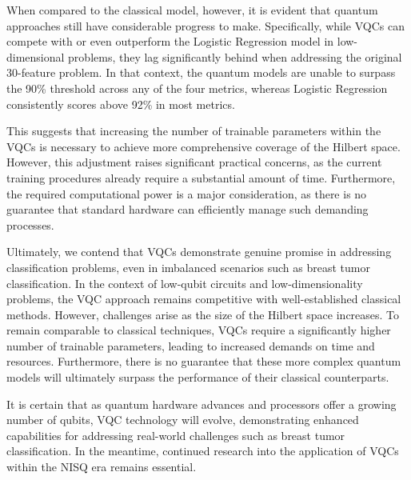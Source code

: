 \documentclass[en]{dimscthesis}
\begin{document}
When compared to the classical model, however, it is evident that quantum approaches still have considerable progress to make. Specifically, while VQCs can compete with or even outperform the Logistic Regression model in low-dimensional problems, they lag significantly behind when addressing the original 30-feature problem. In that context, the quantum models are unable to surpass the 90\% threshold across any of the four metrics, whereas Logistic Regression consistently scores above 92\% in most metrics. 

This suggests that increasing the number of trainable parameters within the VQCs is necessary to achieve more comprehensive coverage of the Hilbert space. However, this adjustment raises significant practical concerns, as the current training procedures already require a substantial amount of time. Furthermore, the required computational power is a major consideration, as there is no guarantee that standard hardware can efficiently manage such demanding processes.

Ultimately, we contend that VQCs demonstrate genuine promise in addressing classification problems, even in imbalanced scenarios such as breast tumor classification. In the context of low-qubit circuits and low-dimensionality problems, the VQC approach remains competitive with well-established classical methods. However, challenges arise as the size of the Hilbert space increases. To remain comparable to classical techniques, VQCs require a significantly higher number of trainable parameters, leading to increased demands on time and resources. Furthermore, there is no guarantee that these more complex quantum models will ultimately surpass the performance of their classical counterparts.

It is certain that as quantum hardware advances and processors offer a growing number of qubits, VQC technology will evolve, demonstrating enhanced capabilities for addressing real-world challenges such as breast tumor classification. In the meantime, continued research into the application of VQCs within the NISQ era remains essential.
\end{document}
